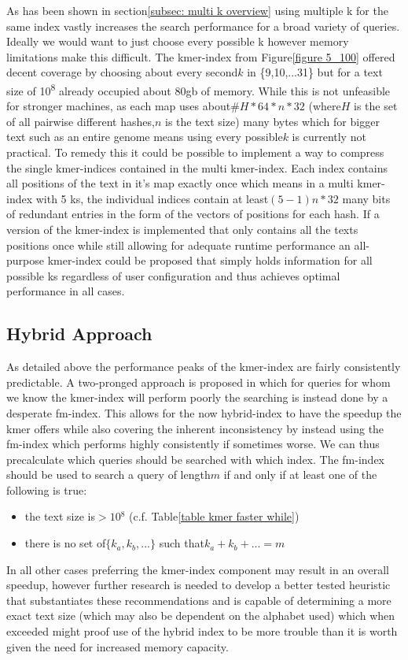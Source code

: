 As has been shown in section\ref{subsec: multi k overview} using
multiple k for the same index vastly increases the search performance
for a broad variety of queries. Ideally we would want to just choose
every possible k however memory limitations make this difficult. The
kmer-index from Figure\ref{figure 5_100} offered decent coverage
by choosing about every second$k$ in \{9,10,...31\} but for a text
size of 10\textsuperscript{8} already occupied about 80gb of memory.
While this is not unfeasible for stronger machines, as each map uses
about$\#H*64*n*32$ (where$H$ is the set of all pairwise different
hashes,$n$ is the text size) many bytes which for bigger text such
as an entire genome means using every possible$k$ is currently not
practical. To remedy this it could be possible to implement a way
to compress the single kmer-indices contained in the multi kmer-index.
Each index contains all positions of the text in it's map exactly
once which means in a multi kmer-index with 5 ks, the individual indices
contain at least$(5-1)n*32$ many bits of redundant entries in the
form of the vectors of positions for each hash. If a version of the
kmer-index is implemented that only contains all the texts positions
once while still allowing for adequate runtime performance an all-purpose
kmer-index could be proposed that simply holds information for all
possible ks regardless of user configuration and thus achieves optimal
performance in all cases.

\subsection{Hybrid Approach}

As detailed above the performance peaks of the kmer-index are fairly
consistently predictable. A two-pronged approach is proposed in which
for queries for whom we know the kmer-index will perform poorly the
searching is instead done by a desperate fm-index. This allows for
the now hybrid-index to have the speedup the kmer offers while also
covering the inherent inconsistency by instead using the fm-index
which performs highly consistently if sometimes worse. We can thus
precalculate which queries should be searched with which index. The
fm-index should be used to search a query of length$m$ if and only
if at least one of the following is true:
\begin{itemize}
\item the text size is$>10{{}^8}$ (c.f. Table\ref{table kmer faster while})
\item there is no set of$\{k_{a},k_{b},...\}$ such that$k_{a}+k_{b}+...=m$
\end{itemize}
In all other cases preferring the kmer-index component may result
in an overall speedup, however further research is needed to develop
a better tested heuristic that substantiates these recommendations
and is capable of determining a more exact text size (which may also
be dependent on the alphabet used) which when exceeded might proof
use of the hybrid index to be more trouble than it is worth given
the need for increased memory capacity.

